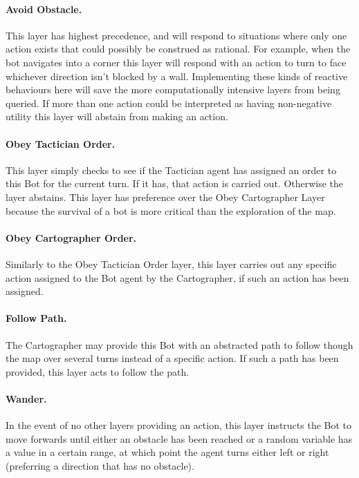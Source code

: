 \documentclass[a4paper,10pt]{article}
\begin{document}
\paragraph{Avoid Obstacle.} This layer has highest precedence, and will respond to situations where only one action exists that could possibly be construed as rational. For example, when the bot navigates into a corner this layer will respond with an action to turn to face whichever direction isn't blocked by a wall. Implementing these kinds of reactive behaviours here will save the more computationally intensive layers from being queried. If more than one action could be interpreted as having non-negative utility this layer will abstain from making an action.

\paragraph{Obey Tactician Order.} This layer simply checks to see if the Tactician agent has assigned an order to this Bot for the current turn. If it has, that action is carried out. Otherwise the layer abstains. This layer has preference over the Obey Cartographer Layer because the survival of a bot is more critical than the exploration of the map.

\paragraph{Obey Cartographer Order.} Similarly to the Obey Tactician Order layer, this layer carries out any specific action assigned to the Bot agent by the Cartographer, if such an action has been assigned.

\paragraph{Follow Path.} The Cartographer may provide this Bot with an abstracted path to follow though the map over several turns instead of a specific action. If such a path has been provided, this layer acts to follow the path.

\paragraph{Wander.} In the event of no other layers providing an action, this layer instructs the Bot to move forwards until either an obstacle has been reached or a random variable has a value in a certain range, at which point the agent turns either left or right (preferring a direction that has no obstacle).
\end{document}
